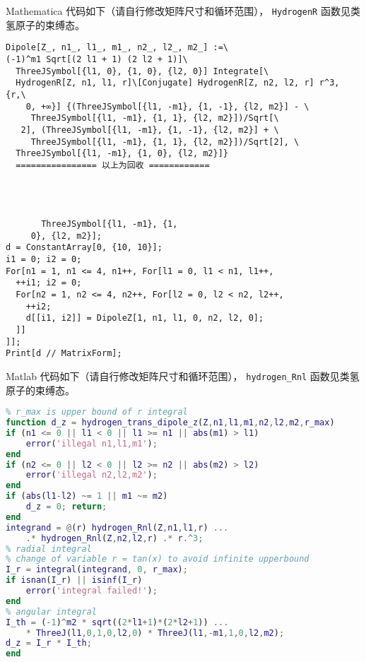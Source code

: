 Mathematica 代码如下（请自行修改矩阵尺寸和循环范围）， \verb|HydrogenR| 函数见类氢原子的束缚态。
\begin{lstlisting}[language=mma,caption=DipoleZ.m]
Dipole[Z_, n1_, l1_, m1_, n2_, l2_, m2_] :=\
(-1)^m1 Sqrt[(2 l1 + 1) (2 l2 + 1)]\
  ThreeJSymbol[{l1, 0}, {1, 0}, {l2, 0}] Integrate[\
  HydrogenR[Z, n1, l1, r]\[Conjugate] HydrogenR[Z, n2, l2, r] r^3, {r,\
    0, +∞}] {(ThreeJSymbol[{l1, -m1}, {1, -1}, {l2, m2}] - \
     ThreeJSymbol[{l1, -m1}, {1, 1}, {l2, m2}])/Sqrt[\
   2], (ThreeJSymbol[{l1, -m1}, {1, -1}, {l2, m2}] + \
     ThreeJSymbol[{l1, -m1}, {1, 1}, {l2, m2}])/Sqrt[2], \
  ThreeJSymbol[{l1, -m1}, {1, 0}, {l2, m2}]}
  ================ 以上为回收 ============

      
     
     
       ThreeJSymbol[{l1, -m1}, {1, 
     0}, {l2, m2}];
d = ConstantArray[0, {10, 10}];
i1 = 0; i2 = 0;
For[n1 = 1, n1 <= 4, n1++, For[l1 = 0, l1 < n1, l1++,
  ++i1; i2 = 0;
  For[n2 = 1, n2 <= 4, n2++, For[l2 = 0, l2 < n2, l2++,
    ++i2;
    d[[i1, i2]] = DipoleZ[1, n1, l1, 0, n2, l2, 0];
  ]]
]];
Print[d // MatrixForm];
\end{lstlisting}
Matlab 代码如下（请自行修改矩阵尺寸和循环范围）， \verb`hydrogen_Rnl` 函数见类氢原子的束缚态。
\begin{lstlisting}[language=matlab,caption=hydrogen\_dipole\_z.m]
% hydrogen <n1,l1,m1|z|n2,l2,m2>
% r_max is upper bound of r integral
function d_z = hydrogen_trans_dipole_z(Z,n1,l1,m1,n2,l2,m2,r_max)
if (n1 <= 0 || l1 < 0 || l1 >= n1 || abs(m1) > l1)
    error('illegal n1,l1,m1');
end
if (n2 <= 0 || l2 < 0 || l2 >= n2 || abs(m2) > l2)
    error('illegal n2,l2,m2');
end
if (abs(l1-l2) ~= 1 || m1 ~= m2)
    d_z = 0; return;
end
integrand = @(r) hydrogen_Rnl(Z,n1,l1,r) ...
    .* hydrogen_Rnl(Z,n2,l2,r) .* r.^3;
% radial integral
% change of variable r = tan(x) to avoid infinite upperbound
I_r = integral(integrand, 0, r_max);
if isnan(I_r) || isinf(I_r)
    error('integral failed!');
end
% angular integral
I_th = (-1)^m2 * sqrt((2*l1+1)*(2*l2+1)) ...
    * ThreeJ(l1,0,1,0,l2,0) * ThreeJ(l1,-m1,1,0,l2,m2);
d_z = I_r * I_th;
end
\end{lstlisting}

